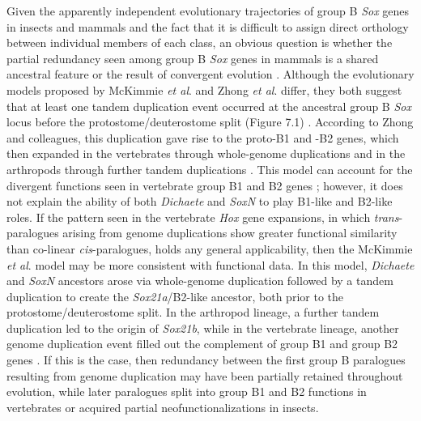 Given the apparently independent evolutionary trajectories of group B \emph{Sox} genes in insects and mammals and the fact that it is difficult to assign direct orthology between individual members of each class, an obvious question is whether the partial redundancy seen among group B \emph{Sox} genes in mammals is a shared ancestral feature or the result of convergent evolution \citep{bergsland_sequentially_2011,ferri_sox2_2004,nishiguchi_sox1_1998,okuda_b1_2010,rizzoti_sox3_2004}. Although the evolutionary models proposed by McKimmie \emph{et al}. and Zhong \emph{et al}. differ, they both suggest that at least one tandem duplication event occurred at the ancestral group B \emph{Sox} locus before the protostome/deuterostome split (Figure 7.1) \citep{mckimmie_conserved_2005, zhong_parallel_2011}. According to Zhong and colleagues, this duplication gave rise to the proto-B1 and -B2 genes, which then expanded in the vertebrates through whole-genome duplications and in the arthropods through further tandem duplications \citep{zhong_parallel_2011}. This model can account for the divergent functions seen in vertebrate group B1 and B2 genes \citep{uchikawa_two_1999}; however, it does not explain the ability of both \emph{Dichaete} and \emph{SoxN} to play B1-like and B2-like roles. If the pattern seen in the vertebrate \emph{Hox} gene expansions, in which \emph{trans}-paralogues arising from genome duplications show greater functional similarity than co-linear \emph{cis}-paralogues, holds any general applicability, then the McKimmie \emph{et al}. model may be more consistent with functional data. In this model, \emph{Dichaete} and \emph{SoxN} ancestors arose via whole-genome duplication followed by a tandem duplication to create the \emph{Sox21a}/B2-like ancestor, both prior to the protostome/deuterostome split. In the arthropod lineage, a further tandem duplication led to the origin of \emph{Sox21b}, while in the vertebrate lineage, another genome duplication event filled out the complement of group B1 and group B2 genes \citep{mckimmie_conserved_2005}. If this is the case, then redundancy between the first group B paralogues resulting from genome duplication may have been partially retained throughout evolution, while later paralogues split into group B1 and B2 functions in vertebrates or acquired partial neofunctionalizations in insects.\\

